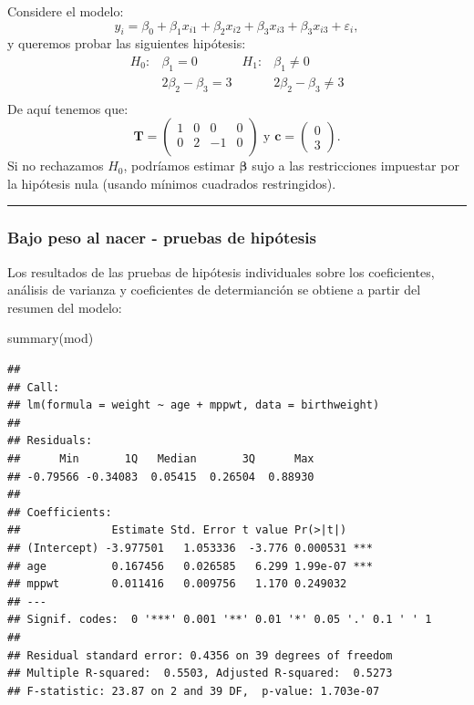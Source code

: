 \documentclass[
]{article}
\newenvironment{Shaded}{\begin{snugshade}}{\end{snugshade}}
\newcommand{\FunctionTok}[1]{\textcolor[rgb]{0.00,0.00,0.00}{#1}}
\newcommand{\NormalTok}[1]{#1}
\begin{document}
Considere el modelo:
\[
y_{i} = \beta_{0} + \beta_{1}x_{i1}+ \beta_{2}x_{i2}+ \beta_{3}x_{i3}+ \beta_{3}x_{i3} + \varepsilon_{i},
\]
y queremos probar las siguientes hipótesis:
\begin{align*}
H_{0}:& \beta_{1}=0 & H_{1}:&\beta_{1}\neq 0 \\
      & 2\beta_{2}-\beta_{3}=3 & &2\beta_{2}-\beta_{3}\neq 3 \\
\end{align*}
De aquí tenemos que:
\[
\boldsymbol T= \begin{pmatrix}
1 & 0 & 0 & 0 \\
0 & 2 & -1 & 0 \\
\end{pmatrix} \mbox{ y } \boldsymbol c= \begin{pmatrix} 0 \\ 3  \end{pmatrix}.
\]
Si no rechazamos \(H_{0}\), podríamos estimar \(\boldsymbol \beta\) sujo a las restricciones impuestar por la hipótesis nula (usando mínimos cuadrados restringidos).

\rule{\textwidth}{0.4pt}

\hypertarget{bajo-peso-al-nacer---pruebas-de-hipuxf3tesis}{%
\subsubsection*{Bajo peso al nacer - pruebas de hipótesis}\label{bajo-peso-al-nacer---pruebas-de-hipuxf3tesis}}

Los resultados de las pruebas de hipótesis individuales sobre los coeficientes, análisis de varianza y coeficientes de determianción se obtiene a partir del resumen del modelo:

\begin{Shaded}
\begin{Highlighting}[]
\FunctionTok{summary}\NormalTok{(mod)}
\end{Highlighting}
\end{Shaded}

\begin{verbatim}
## 
## Call:
## lm(formula = weight ~ age + mppwt, data = birthweight)
## 
## Residuals:
##      Min       1Q   Median       3Q      Max 
## -0.79566 -0.34083  0.05415  0.26504  0.88930 
## 
## Coefficients:
##              Estimate Std. Error t value Pr(>|t|)    
## (Intercept) -3.977501   1.053336  -3.776 0.000531 ***
## age          0.167456   0.026585   6.299 1.99e-07 ***
## mppwt        0.011416   0.009756   1.170 0.249032    
## ---
## Signif. codes:  0 '***' 0.001 '**' 0.01 '*' 0.05 '.' 0.1 ' ' 1
## 
## Residual standard error: 0.4356 on 39 degrees of freedom
## Multiple R-squared:  0.5503, Adjusted R-squared:  0.5273 
## F-statistic: 23.87 on 2 and 39 DF,  p-value: 1.703e-07
\end{verbatim}
\end{document}
